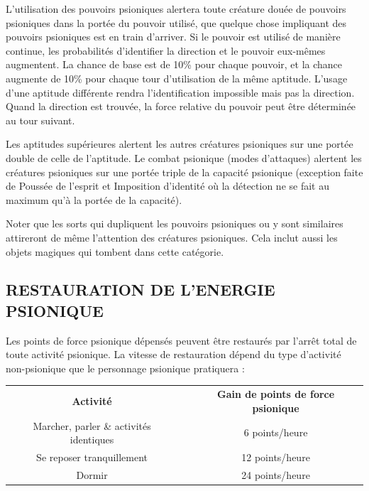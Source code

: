 {L'utilisation des pouvoirs psioniques alertera toute créature douée de pouvoirs psioniques dans la portée du pouvoir utilisé, que quelque chose impliquant des pouvoirs psioniques est en train d'arriver. Si le pouvoir est utilisé de manière continue, les probabilités d'identifier la direction et le pouvoir eux-mêmes augmentent. La chance de base est de 10\% pour chaque pouvoir, et la chance augmente de 10\% pour chaque tour d'utilisation de la même aptitude. L'usage d'une aptitude différente rendra l'identification impossible mais pas la direction. Quand la direction est trouvée, la force relative du pouvoir peut être déterminée au tour suivant.

\bigskip

Les aptitudes supérieures alertent les autres créatures psioniques sur une portée double de celle de l'aptitude. Le combat psionique (modes d'attaques) alertent les créatures psioniques sur une portée triple de la capacité psionique (exception faite de Poussée de l'esprit et Imposition d'identité où la détection ne se fait au maximum qu'à la portée de la capacité).

\bigskip

Noter que les sorts qui dupliquent les pouvoirs psioniques ou y sont similaires attireront de même l'attention des créatures psioniques. Cela inclut aussi les objets magiques qui tombent dans cette catégorie.

\subsection*{\normalsize RESTAURATION DE L'ENERGIE PSIONIQUE}

Les points de force psionique dépensés peuvent être restaurés par l'arrêt total de toute activité psionique. La vitesse de restauration dépend du type d'activité non-psionique que le personnage psionique pratiquera :

\begin{center}
\begin{tabular}{cp{0.3cm}c}
\textbf{Activité} && \textbf{Gain de points de force psionique} \\
Marcher, parler \& activités identiques && 6 points/heure \\
Se reposer tranquillement && 12 points/heure \\
Dormir && 24 points/heure \\
\end{tabular}
\end{center}

}
